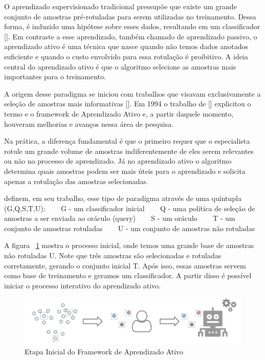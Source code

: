 O aprendizado supervisionado tradicional pressupõe que existe um grande conjunto de amostras pré-rotuladas para serem utilizadas no treinamento. Dessa forma, é induzido uma hipótese sobre esses dados, resultando em um classificador [\cite{settles2014active}]. Em contraste a esse aprendizado, também chamado de aprendizado passivo, o aprendizado ativo  é uma técnica que nasce quando não temos dados anotados suficiente e quando o custo envolvido para essa rotulação é proibitivo. A ideia central do aprendizado ativo é que o algoritmo selecione as amostras mais importantes para o treinamento. 


A origem desse paradigma se iniciou com trabalhos que visavam exclusivamente a seleção de amostras mais informativas [\cite{angluin1988queries, baum1992query, atlas1990training}]. Em 1994 o trabalho de [\cite{cohn1994improving}] explicitou o termo e o framework de Aprendizado Ativo e, a partir daquele momento, houveram melhorias e avanços nessa área de pesquisa. 


Na prática, a diferença fundamental é que o primeiro requer que o especialista rotule um grande volume de amostras indiferentemente de eles serem relevantes ou não no processo de aprendizado. Já no aprendizado ativo o algoritmo determina quais amostras podem ser mais úteis para o aprendizado e solicita apenas a rotulação das amostras selecionadas. 

\cite{persello2012active} definem, em seu trabalho, esse tipo de paradigma através de uma quíntupla (G,Q,S,T,U):
\newline
\newline
~~~ G - um classificador inicial 
\newline
~~~ Q - uma política de seleção de amostras a ser enviada ao oráculo (query)
\newline 
~~~ S - um oráculo
\newline 
~~~ T - um conjunto de amostras rotuladas
\newline 
~~~ U - um conjunto de amostras não rotuladas


A figura ~\ref{fig:framework_AL_classico_etapa_inicial} mostra o processo inicial, onde temos uma grande base de amostras não rotuladas U. Note que três amostras são selecionadas e rotuladas corretamente, gerando o conjunto inicial T. Após isso, essas amostras servem como base de treinamento e geramos um classificador. A partir disso é possível iniciar o processo interativo do aprendizado ativo.


\begin{figure}
  \centering
  \includegraphics[width=.9\textwidth]{figures/Framework_processo_inicial.png}
  \caption{Etapa Inicial do Framework de Aprendizado Ativo}
  \label{fig:framework_AL_classico_etapa_inicial}
\end{figure}


